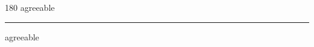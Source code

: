 
\begin{frame}
\begin{center}
\begin{turn}{180}
{\fontsize{2.5cm}{1em}\selectfont agreeable}
\end{turn}
\vspace{1em}\par  
\hrule
\vspace{1em}\par  
{\fontsize{2.5cm}{1em}\selectfont agreeable}
\end{center}
\end{frame}
